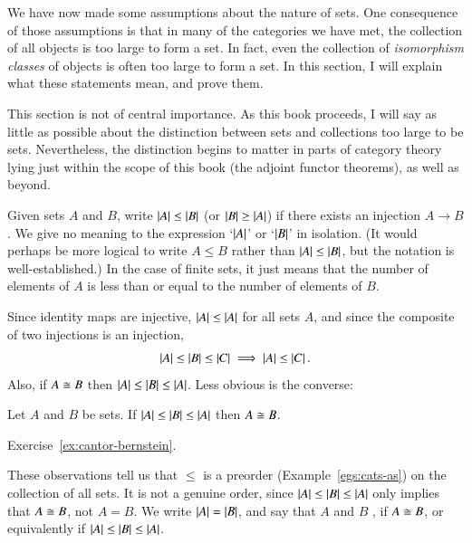We have now made some assumptions about the nature of sets.  One
consequence of those assumptions is that in many of the categories we have
met, the collection of all objects is too large to form a set.  In fact,
even the collection of \emph{isomorphism classes} of objects is often too
large to form a set.  In this section, I will explain what these statements
mean, and prove them.

This section is not of central importance.  As this book proceeds, I will
say as little as possible about the distinction between sets and
collections too large to be sets.  Nevertheless, the distinction begins to
matter in parts of category theory lying just within the scope of this book
(the adjoint functor theorems), as well as beyond.

Given sets $A$ and $B$, write $\left|A\right| \leq \left|B\right|$%
%
%
%
(or $\left|B\right| \geq \left|A\right|$) if there exists an injection $A \to B$.  We
give no meaning to the expression `$\left|A\right|$' or `$\left|B\right|$' in isolation.
(It would perhaps be more logical to write $A \leq B$ rather than $\left|A\right|
\leq \left|B\right|$, but the notation is well-established.)  In the case of
finite sets, it just means that the number of elements of $A$ is less than
or equal to the number of elements of $B$.

Since identity maps are injective, $\left|A\right| \leq \left|A\right|$ for all sets
$A$, and since the composite of two injections is an injection,
\[
\left|A\right| \leq \left|B\right| \leq \left|C\right| \implies \left|A\right| \leq \left|C\right|.
\]
Also, if $A \cong B$ then $\left|A\right| \leq \left|B\right| \leq \left|A\right|$.  Less obvious
is the converse:

\begin{thm}	
\label{thm:cantor-bernstein}
%
%
Let $A$ and $B$ be sets.  If $\left|A\right| \leq \left|B\right| \leq \left|A\right|$ then $A
\cong B$. 
\end{thm}

\begin{pf}
Exercise~\ref{ex:cantor-bernstein}.  
\end{pf}

These observations tell us that $\leq$ is a preorder
(Example~\ref{egs:cats-as}) on the collection of
all sets.  It is not a genuine order, since $\left|A\right| \leq \left|B\right| \leq
\left|A\right|$ only implies that $A \cong B$, not $A = B$.  We write $\left|A\right| =
\left|B\right|$,%
%
%
and say that $A$ and $B$ ,%
%
%
if $A \cong B$, or equivalently if $\left|A\right| \leq \left|B\right| \leq \left|A\right|$.

